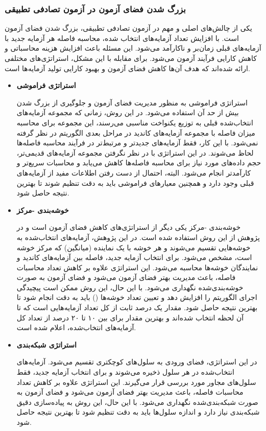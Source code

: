 \subsubsection{بزرگ شدن فضای آزمون در آزمون تصادفی تطبیقی}
یکی از چالش‌های اصلی و مهم در آزمون تصادفی تطبیقی، بزرگ شدن فضای آزمون است. با افزایش تعداد آزمایه‌های انتخاب شده، محاسبه فاصله هر آزمایه جدید با آزمایه‌های قبلی زمان‌بر و ناکارآمد می‌شود. این مسئله باعث افزایش هزینه محاسباتی و کاهش کارایی فرآیند آزمون می‌شود. برای مقابله با این مشکل، استراتژی‌های مختلفی ارائه شده‌اند که هدف آن‌ها کاهش فضای آزمون و بهبود کارایی تولید آزمایه‌ها است.
\begin{itemize}
	\item \textbf{استراتژی فراموشی}
	
	 استراتژی فراموشی \cite{chan2006forgetting}\cite{mao2017out} به منظور مدیریت فضای آزمون و جلوگیری از بزرگ شدن بیش از حد آن استفاده می‌شود. در این روش، زمانی که مجموعه آزمایه‌های انتخاب‌شده قبلی به توزیع یکنواخت مناسبی می‌رسند، این مجموعه برای محاسبه میزان فاصله با مجموعه آزمایه‌های کاندید در مراحل بعدی الگوریتم در نظر گرفته نمی‌شود. با این کار، فقط آزمایه‌های جدیدتر و مرتبط‌تر در فرآیند محاسبه فاصله‌ها لحاظ می‌شوند. در این استراتژی با در نظر نگرفتن مجموعه آزمایه‌های قدیمی‌تر، حجم داده‌های مورد نیاز برای محاسبه فاصله‌ها کاهش می‌یابد و محاسبات سریع‌تر و کارآمدتر انجام می‌شود. البته، احتمال از دست رفتن اطلاعات مفید از آزمایه‌های قبلی وجود دارد و همچنین معیارهای فراموشی باید به دقت تنظیم شوند تا بهترین نتیجه حاصل شود.
	
	\item \textbf{خوشه‌بندی -مرکز}
	
	 خوشه‌بندی -مرکز \cite{burkardt2009k} یکی دیگر از استراتژی‌های کاهش فضای آزمون است و در پژوهش\cite{chen2021novel} از این روش استفاده شده است. در این پژوهش، آزمایه‌های انتخاب‌شده به خوشه‌هایی تقسیم می‌شوند و هر خوشه با یک نماینده (میانگین) که مرکز خوشه است، مشخص می‌شود. برای انتخاب آزمایه جدید، فاصله بین آزمایه‌های کاندید و نمایندگان خوشه‌ها محاسبه می‌شود. این استراتژی علاوه بر کاهش تعداد محاسبات فاصله، باعث مدیریت بهتر فضای آزمون می‌شود و فضای آزمون به صورت خوشه‌بندی‌شده نگهداری می‌شود. با این حال، این روش ممکن است پیچیدگی اجرای الگوریتم را افزایش دهد و تعیین تعداد خوشه‌ها () باید به دقت انجام شود تا بهترین نتیجه حاصل شود.
	مقدار  یک درصد ثابت از کل تعداد آزمایه‌هایی است که تا آن لحظه انتخاب شده‌اند و بهترین مقدار برای  بین ۱۰ تا ۲۰ درصد از تعداد کل آزمایه‌های انتخاب‌شده، اعلام شده است.
	\newpage
	\item \textbf{استراتژی شبکه‌بندی}
	
	 در این استراتژی، فضای ورودی به سلول‌های کوچکتری تقسیم می‌شود. آزمایه‌های انتخاب‌شده در هر سلول ذخیره می‌شوند و برای انتخاب آزمایه جدید، فقط سلول‌های مجاور مورد بررسی قرار می‌گیرند\cite{chow2013art}. این استراتژی علاوه بر کاهش تعداد محاسبات فاصله، باعث مدیریت بهتر فضای آزمون می‌شود و فضای آزمون به صورت شبکه‌بندی‌شده نگهداری می‌شود. با این حال، این روش به پیاده‌سازی دقیق شبکه‌بندی نیاز دارد و اندازه سلول‌ها باید به دقت تنظیم شود تا بهترین نتیجه حاصل شود.

\end{itemize}

